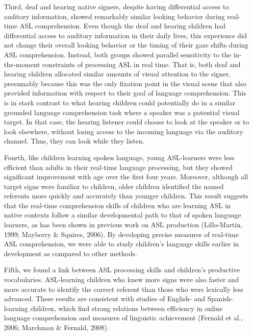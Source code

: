 \documentclass[oneside]{report}
\begin{document}
Third, deaf and hearing native signers, despite having differential
access to auditory information, showed remarkably similar looking
behavior during real-time ASL comprehension. Even though the deaf and
hearing children had differential access to auditory information in
their daily lives, this experience did not change their overall looking
behavior or the timing of their gaze shifts during ASL comprehension.
Instead, both groups showed parallel sensitivity to the in-the-moment
constraints of processing ASL in real time. That is, both deaf and
hearing children allocated similar amounts of visual attention to the
signer, presumably because this was the only fixation point in the
visual scene that also provided information with respect to their goal
of language comprehension. This is in stark contrast to what hearing
children could potentially do in a similar grounded language
comprehension task where a speaker was a potential visual target. In
that case, the hearing listener could choose to look at the speaker or
to look elsewhere, without losing access to the incoming language via
the auditory channel. Thus, they can look while they listen.

Fourth, like children learning spoken language, young ASL-learners were
less efficient than adults in their real-time language processing, but
they showed significant improvement with age over the first four years.
Moreover, although all target signs were familiar to children, older
children identified the named referents more quickly and accurately than
younger children. This result suggests that the real-time comprehension
skills of children who are learning ASL in native contexts follow a
similar developmental path to that of spoken language learners, as has
been shown in previous work on ASL production (Lillo-Martin, 1999;
Mayberry \& Squires, 2006). By developing precise measures of real-time
ASL comprehension, we were able to study children's language skills
earlier in development as compared to other methods.

Fifth, we found a link between ASL processing skills and children's
productive vocabularies. ASL-learning children who knew more signs were
also faster and more accurate to identify the correct referent than
those who were lexically less advanced. These results are consistent
with studies of English- and Spanish-learning children, which find
strong relations between efficiency in online language comprehension and
measures of linguistic achievement (Fernald et al., 2006; Marchman \&
Fernald, 2008).
\end{document}
